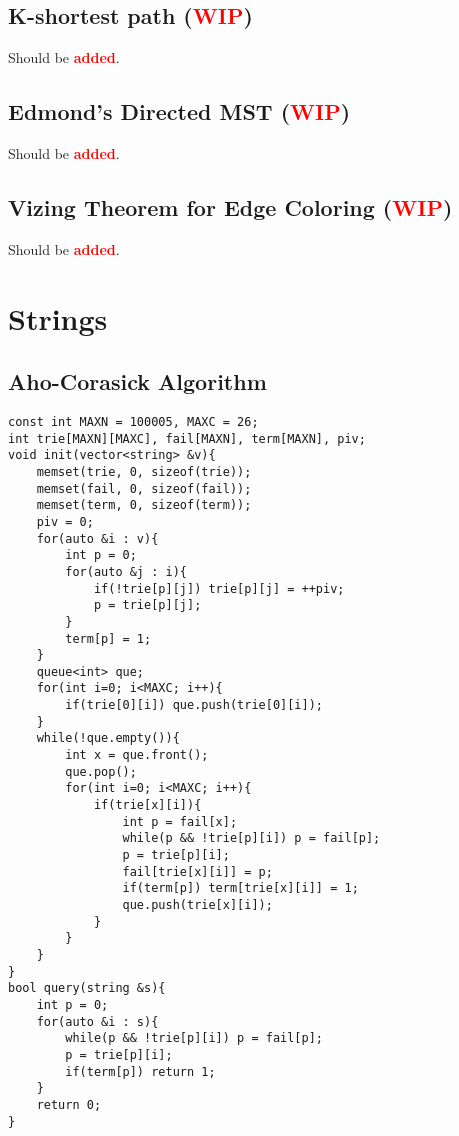 \documentclass[landscape, 8pt, a4paper, oneside,  twocolumn]{extarticle}
\newcommand{\added}{Should be \textcolor{red}{\textbf{added}}.}
\newcommand{\WIP}{\textcolor{red}{\textbf{WIP}}}
\begin{document}
\subsection{K-shortest path (\WIP)}
\added

\subsection {Edmond's Directed MST (\WIP)}
\added

\subsection {Vizing Theorem for Edge Coloring (\WIP)}
\added

\section{Strings}

\subsection{Aho-Corasick Algorithm}
\begin{verbatim}
const int MAXN = 100005, MAXC = 26;
int trie[MAXN][MAXC], fail[MAXN], term[MAXN], piv;
void init(vector<string> &v){
	memset(trie, 0, sizeof(trie));
	memset(fail, 0, sizeof(fail));
	memset(term, 0, sizeof(term));
	piv = 0;
	for(auto &i : v){
		int p = 0;
		for(auto &j : i){
			if(!trie[p][j]) trie[p][j] = ++piv;
			p = trie[p][j];
		}
		term[p] = 1;
	}
	queue<int> que;
	for(int i=0; i<MAXC; i++){
		if(trie[0][i]) que.push(trie[0][i]);
	}
	while(!que.empty()){
		int x = que.front();
		que.pop();
		for(int i=0; i<MAXC; i++){
			if(trie[x][i]){
				int p = fail[x];
				while(p && !trie[p][i]) p = fail[p];
				p = trie[p][i];
				fail[trie[x][i]] = p;
				if(term[p]) term[trie[x][i]] = 1;
				que.push(trie[x][i]);
			}
		}
	}
}
bool query(string &s){
	int p = 0;
	for(auto &i : s){
		while(p && !trie[p][i]) p = fail[p];
		p = trie[p][i];
		if(term[p]) return 1;
	}
	return 0;
}
\end{verbatim}
\end{document}
